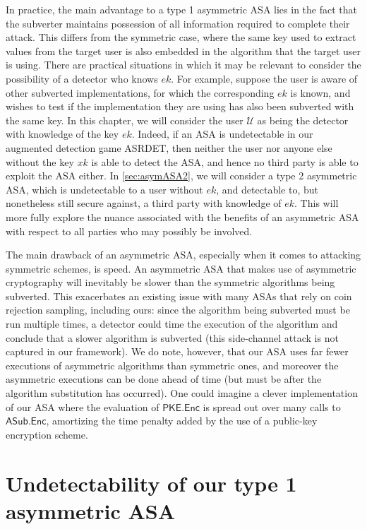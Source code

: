 In practice, the main advantage to a type 1 asymmetric ASA lies in the fact that the subverter maintains possession of all information required to complete their attack. This differs from the symmetric case, where the same key used to extract values from the target user is also embedded in the algorithm that the target user is using. There are practical situations in which it may be relevant to consider the possibility of a detector who knows $ek$. For example, suppose the user is aware of other subverted implementations, for which the corresponding $ek$ is known, and wishes to test if the implementation they are using has also been subverted with the same key. In this chapter, we will consider the user $\mathcal{U}$ as being the detector with knowledge of the key $ek$. Indeed, if an ASA is undetectable in our augmented detection game ASRDET, then neither the user nor anyone else without the key $xk$ is able to detect the ASA, and hence no third party is able to exploit the ASA either. In \autoref{sec:asymASA2}, we will consider a type 2 asymmetric ASA, which is undetectable to a user without $ek$, and detectable to, but nonetheless still secure against, a third party with knowledge of $ek$. This will more fully explore the nuance associated with the benefits of an asymmetric ASA with respect to all parties who may possibly be involved.

The main drawback of an asymmetric ASA, especially when it comes to attacking symmetric schemes, is speed. An asymmetric ASA that makes use of asymmetric cryptography will inevitably be slower than the symmetric algorithms being subverted. This exacerbates an existing issue with many ASAs that rely on coin rejection sampling, including ours: since the algorithm being subverted must be run multiple times, a detector could time the execution of the algorithm and conclude that a slower algorithm is subverted (this side-channel attack is not captured in our framework). We do note, however, that our ASA uses far fewer executions of asymmetric algorithms than symmetric ones, and moreover the asymmetric executions can be done ahead of time (but must be after the algorithm substitution has occurred). One could imagine a clever implementation of our ASA where the evaluation of $\mathsf{PKE.Enc}$ is spread out over many calls to $\mathsf{ASub.Enc}$, amortizing the time penalty added by the use of a public-key encryption scheme.

\section{Undetectability of our type 1 asymmetric ASA}

